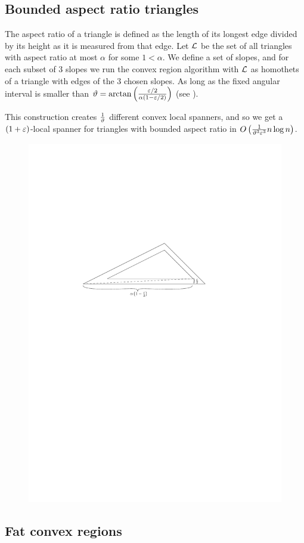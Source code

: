 \documentclass[12pt]{article}%
\begin{document}
\subsection{Bounded aspect ratio triangles}

The aspect ratio of a triangle is defined as the length of its longest
edge divided by its height as it is measured from that edge. Let $\mathcal{L}$
be the set of all triangles with aspect ratio at most $\alpha$ for
some $1 < \alpha$. We define a set of slopes, and for each subset of 3
slopes we run the convex region algorithm with $\mathcal{L}$ as homothets of a
triangle with edges of the 3 chosen slopes. As long as the fixed
angular interval is smaller than
$\vartheta = \arctan\left(\frac{\varepsilon/2}{\alpha(1-\varepsilon/2)}\right)$ (see
).

This construction creates $\frac{1}{\vartheta}$ different convex local
spanners, and so we get a $(1+\varepsilon)$-local spanner for triangles with
bounded aspect ratio in
$O\left(\frac{1}{\vartheta^3\varepsilon^3} n\log n\right)$.


\begin{figure}
    \centering
    \includegraphics[width=0.6\linewidth]{figs/triangle_shadow}
\end{figure}


\subsection{Fat convex regions}
\end{document}
